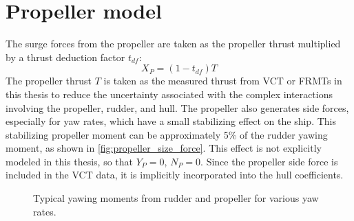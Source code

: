 \section{Propeller model} \label{sec:propeller}
The surge forces from the propeller are taken as the propeller thrust multiplied by a thrust deduction factor $t_{df}$:
\begin{equation}
    \label{eq:X_P}
    X_P = (1-t_{df})T
\end{equation}
The propeller thrust $T$ is taken as the measured thrust from VCT or FRMTs in this thesis to reduce the uncertainty associated with the complex interactions involving the propeller, rudder, and hull. The propeller also generates side forces, especially for yaw rates, which have a small stabilizing effect on the ship. This stabilizing propeller moment can be approximately 5\% of the rudder yawing moment, as shown in \autoref{fig:propeller_size_force}.
This effect is not explicitly modeled in this thesis, so that $Y_P=0$, $N_P=0$. Since the propeller side force is included in the VCT data, it is implicitly incorporated into the hull coefficients.
\begin{figure}[h]
    \centering
    

    \begin{minipage}[t]{5.25in}
    \caption{Typical yawing moments from rudder and propeller for various yaw rates.}
	\label{fig:propeller_size_force}
    \end{minipage}
        
\end{figure}
